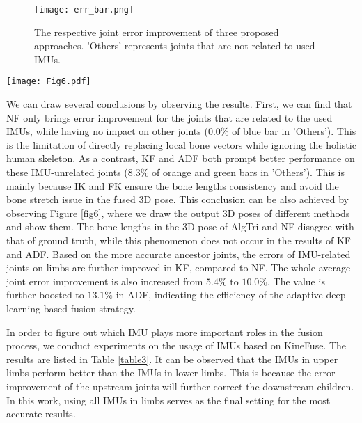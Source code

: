 \documentclass[lettersize,journal]{IEEEtran}
\begin{document}
\begin{figure}[!tp]
 \begin{center}
 	\centerline{\texttt{[image: err\_bar.png]}}
\caption{The respective joint error improvement of three proposed approaches. 'Others' represents joints that are not related to used IMUs.}
\label{fig5}
\end{center}
\end{figure}

\begin{figure*}[!tp]
 \begin{center}
 	\centerline{\texttt{[image: Fig6.pdf]}}
\caption{Illustration of different 3D pose results on Total Capture dataset. Self-occlusions exist in most of used image views on the selected cases, while being solved via kinematic constrains and efficient IMU-vision fusion.}
\label{fig6}
\end{center}
\end{figure*}

We can draw several conclusions by observing the results. First, we can find that NF only brings error improvement for the joints that are related to the used IMUs, while having no impact on other joints ($0.0\%$ of blue bar in 'Others'). This is the limitation of directly replacing local bone vectors while ignoring the holistic human skeleton. As a contrast, KF and ADF both prompt better performance on these IMU-unrelated joints ($8.3\%$ of orange and green bars in 'Others'). This is mainly because IK and FK ensure the bone lengths consistency and avoid the bone stretch issue in the fused 3D pose. This conclusion can be also achieved by observing Figure \ref{fig6}, where we draw the output 3D poses of different methods and show them. The bone lengths in the 3D pose of AlgTri and NF disagree with that of ground truth, while this phenomenon does not occur in the results of KF and ADF. Based on the more accurate ancestor joints, the errors of IMU-related joints on limbs are further improved in KF, compared to NF. The whole average joint error improvement is also increased from $5.4\%$ to $10.0\%$. The value is further boosted to $13.1\%$ in ADF, indicating the efficiency of the adaptive deep learning-based fusion strategy.

In order to figure out which IMU plays more important roles in the fusion process, we conduct experiments on the usage of IMUs based on KineFuse. The results are listed in Table \ref{table3}. It can be observed that the IMUs in upper limbs perform better than the IMUs in lower limbs. This is because the error improvement of the upstream joints will further correct the downstream children. In this work, using all IMUs in limbs serves as the final setting for the most accurate results.
\end{document}
